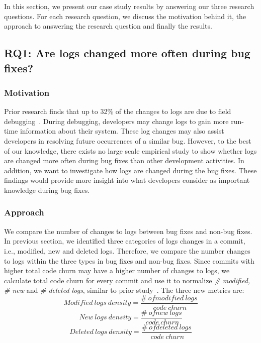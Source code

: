 	In this section, we present our case study results by answering our three research questions. For each research question, we discuss the motivation behind it, the approach to answering the research question and finally the results.

\subsection*{RQ1: Are logs changed more often during bug fixes?}


\subsubsection*{\textbf{Motivation}}

Prior research finds that up to 32\% of the changes to logs are due to field debugging~\cite{EMSEIAN}. During debugging, developers may change logs to gain more run-time information about their system. These log changes may also assist developers in resolving future occurrences of a similar bug. However, to the best of our knowledge, there exists no large scale empirical study to show whether logs are changed more often during bug fixes than other development activities. In addition, we want to investigate how logs are changed during the bug fixes. These findings would provide more insight into what developers consider as important knowledge during bug fixes.

\subsubsection*{\textbf{Approach}}

We compare the number of changes to logs between bug fixes and non-bug fixes. In previous section, we identified three categories of logs changes in a commit, i.e., modified, new and deleted logs. Therefore, we compare the number changes to logs within the three types in bug fixes and non-bug fixes. Since commits with higher total code churn may have a higher number of changes to logs, we calculate total code churn for every commit and use it to normalize \emph{\# modified, \# new} and \emph{\# deleted logs}, similar to prior study~\cite{Characterizinglogs}. The three new metrics are:
\begin{equation}
Modified\ logs\ density = \frac{\#\ of modified\ logs}{\ code\ churn } 
\label{eq1}
\end{equation}
\begin{equation}
New\ logs\  density = \frac{\#\ of new\ logs}{\ code\ churn } 
\label{eq2}
\end{equation}
\begin{equation}
Deleted\ logs\ density = \frac{\#\ of deleted\ logs}{\ code\ churn }
\label{eq3} 
\end{equation}

